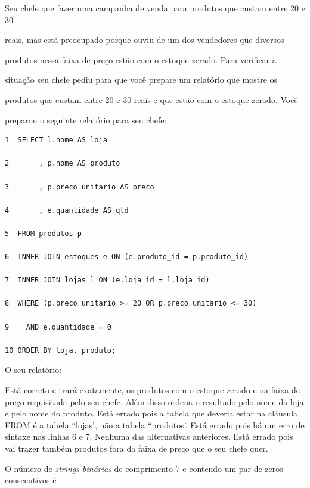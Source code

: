 \documentclass[12pt, addpoints]{exam}
\begin{document}
\begin{questions}
\question

Seu chefe que fazer uma campanha de venda para produtos que custam entre 20 e 30

reais, mas está preocupado porque ouviu de um dos vendedores que diversos

produtos nessa faixa de preço estão com o estoque zerado. Para verificar a

situação seu chefe pediu para que você prepare um relatório que mostre os

produtos que custam entre 20 e 30 reais e que estão com o estoque zerado. Você

preparou o seguinte relatório para seu chefe:

\begin{tcolorbox}

 \begin{verbatim}1  SELECT l.nome AS loja

2       , p.nome AS produto

3       , p.preco_unitario AS preco

4       , e.quantidade AS qtd

5  FROM produtos p

6  INNER JOIN estoques e ON (e.produto_id = p.produto_id)

7  INNER JOIN lojas l ON (e.loja_id = l.loja_id)

8  WHERE (p.preco_unitario >= 20 OR p.preco_unitario <= 30)

9    AND e.quantidade = 0

10 ORDER BY loja, produto;

 \end{verbatim}

\end{tcolorbox}

O seu relatório:
\begin{choices}
\choice Está correto e trará exatamente, os produtos com o estoque zerado e na faixa de preço requisitada pelo seu chefe. Além disso ordena o resultado pelo nome da loja e pelo nome do produto.
\choice Está errado pois a tabela que deveria estar na cláusula FROM é a tabela ``lojas', não a tabela ``produtos'.
\choice Está errado pois há um erro de sintaxe nas linhas 6 e 7.
\choice Nenhuma das alternativas anteriores.
\choice Está errado pois vai trazer também produtos fora da faixa de preço que o seu chefe quer.
\end{choices}

\question

O número de \textit{strings binárias} de comprimento 7 e contendo um par de zeros consecutivos é



\end{questions}
\end{document}
